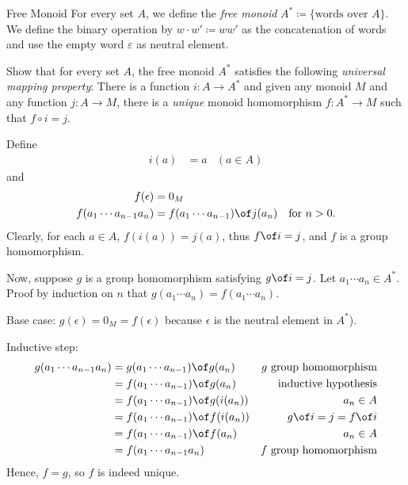 \begin{definition}{Free Monoid}
  For every set $A$, we define the \emph{free monoid} $A^* \coloneqq \lbrace \text{words over $A$} \rbrace$.
  We define the binary operation by $w \cdot w' \coloneqq ww'$ as the concatenation of words and use the empty word $\varepsilon$ as neutral element.
\end{definition}

\begin{exercise}
  Show that for every set $A$, the free monoid $A^*$ satisfies the following \emph{universal mapping property}:
  There is a function $i : A \to A^*$ and given any monoid $M$ and any function $j : A \to M$, there is a \emph{unique} monoid homomorphism $f : A^* \to M$ such that $f \circ i = j$.
\end{exercise}

\begin{answer}
  Define
  \begin{align*}
    i(a)&=a &(a\in A)
  \end{align*}
  and
  \begin{align*}
    f(\epsilon)&=0_M&\\
    f(a_1\cdots a_{n-1}a_n)&=f(a_1\cdots a_{n-1})\of j(a_n) &\text{for }n>0.
  \end{align*}
  Clearly, for each $a\in A$, $f(i(a))=j(a)$, thus $f\of i=j$, and $f$ is a group homomorphism.

  Now, suppose $g$ is a group homomorphism satisfying $g\of i=j$.
  Let $a_1\cdots a_n\in A^*$. Proof by induction on $n$ that $g(a_1\cdots a_n)=f(a_1\cdots a_n)$.

  Base case: $g(\epsilon)=0_M=f(\epsilon)$ because $\epsilon$ is the neutral element in $A^*$).

  Inductive step:
  \begin{align*}
    g(a_1\cdots a_{n-1}a_n)&=g(a_1\cdots a_{n-1})\of g(a_n)&g\text{ group homomorphism}\\
                           &=f(a_1\cdots a_{n-1})\of g(a_n)&\text{inductive hypothesis}\\
                           &=f(a_1\cdots a_{n-1})\of g(i(a_n)) & a_n\in A\\
                           &=f(a_1\cdots a_{n-1})\of f(i(a_n)) & g\of i=j=f\of i\\
                           &=f(a_1\cdots a_{n-1})\of f(a_n) & a_n\in A\\
                           &=f(a_1\cdots a_{n-1}a_n)&f\text{ group homomorphism}
  \end{align*}
  Hence, $f=g$, so $f$ is indeed unique.

\end{answer}

